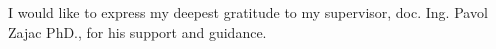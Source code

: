 I would like to express my deepest gratitude to my supervisor, doc. Ing. Pavol Zajac PhD., for his support and guidance. 